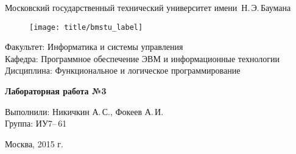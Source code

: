 
\thispagestyle{empty}

\begin{center}
	\Large
	Московский государственный технический университет имени~Н.\,Э.\,Баумана
\end{center}

\begin{figure}[h!]
	\begin{center}
		\texttt{[image: title/bmstu\_label]}
	\end{center}
\end{figure}

{\large
\noindent
Факультет: Информатика и системы управления\\[2mm]
\noindent
Кафедра: Программное обеспечение ЭВМ и информационные технологии\\[2mm]
\noindent
Дисциплина: Функциональное и логическое программирование
\vspace{1.5cm}}

\begin{center}
	\Large
	\textbf{Лабораторная работа №3}
\end{center}
\vfill

\hfill\begin{minipage}{0.5\textwidth}
	Выполнили: Никичкин А.\,С., Фокеев А.\,И.\\
	Группа: ИУ7--\,61
\end{minipage}
\vfill

\begin{center}
	Москва, 2015 г.
\end{center}